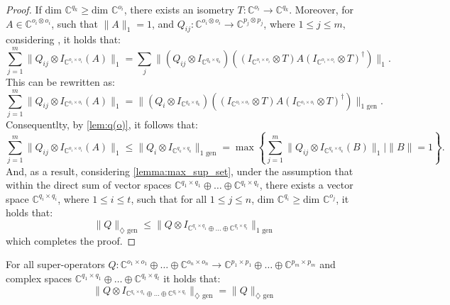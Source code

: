 \begin{proof}
  
  If $\text{dim } \mathbb{C}^{q_k} \geq \text{dim } \mathbb{C}^{o_i}$, there exists an isometry $T: \mathbb{C}^{o_i} \rightarrow \mathbb{C}^{q_k}$. Moreover, for $A \in \mathbb{C}^{o_i \otimes o_i}$, such that $\|A\|_1=1$, and $Q_{ij}: \mathbb{C}^{o_i \otimes o_i} \rightarrow \mathbb{C}^{p_j \otimes p_j}$, where $1 \leq j \leq m$, considering \cite[Proof of Theorem 3.36]{watrous2018theory}, it holds that:
  \begin{equation}
    \sum_{j=1}^{m} \lVert Q_{ij} \otimes I_{\mathbb{C}^{o_i \times o_i}} (A) \rVert_{1} = \sum_j \lVert (Q_{ij} \otimes I_{\mathbb{C}^{q_k \times q_k}}) ((I_{\mathbb{C}^{o_i \times o_i}} \otimes T) A (I_{\mathbb{C}^{o_i \times o_i}} \otimes T )^\dag) \rVert_{1}. 
  \end{equation}
This can be rewritten as:
\begin{equation}
  \sum_{j=1}^{m} \lVert Q_{ij} \otimes I_{\mathbb{C}^{o_i \times o_i}} (A) \rVert_{1} =  \lVert (Q_{i} \otimes I_{\mathbb{C}^{q_k \times q_k}}) ((I_{\mathbb{C}^{o_i \times o_i}} \otimes T) A (I_{\mathbb{C}^{o_i \times o_i}} \otimes T )^\dag) \rVert_{1 \text{ gen}}. 
\end{equation}
Consequentlty, by \autoref{lem:q(o)}, it follows that:
\begin{equation}
  \sum_{j=1}^{m} \lVert Q_{ij} \otimes I_{\mathbb{C}^{o_i \times o_i}} (A) \rVert_{1} \leq \lVert Q_{i} \otimes I_{\mathbb{C}^{q_k \times q_k}} \rVert_{1 \text{ gen}} = \max \left\{\sum_{j=1}^{m} \lVert Q_{ij} \otimes I_{\mathbb{C}^{q_k \times q_k}} (B) \rVert_{1} \mid \|B\| = 1\right\}.
\end{equation}
And, as a result, considering \autoref{lemma:max_sup_set},  under the assumption that within the direct sum of vector spaces $\mathbb{C}^{q_1 \times q_1} \oplus \ldots \oplus \mathbb{C}^{q_t \times q_t}$, there  exists a vector space $\mathbb{C}^{q_i \times q_i}$, where $1 \leq i \leq t$, such that for all $1 \leq j \leq n$, $\text{dim }\mathbb{C}^{q_i} \geq  \text{dim }\mathbb{C}^{o_j}$, it holds that: 
\begin{equation}
    \lVert Q \rVert_{\diamondsuit \text{ gen}} \leq  \lVert Q \otimes I_{\mathbb{C}^{q_1 \times q_1} \oplus \ldots \oplus \mathbb{C}^{q_t \times q_t}} \rVert_{1 \text{ gen}}
\end{equation}
which completes the proof.
\end{proof}

 
 

\begin{corollary} \label{cor:tensor_stability}
  For all super-operators  $Q: \mathbb{C}^{o_1 \times o_1} \oplus \ldots \oplus \mathbb{C}^{o_n \times o_n}  \rightarrow \mathbb{C}^{p_1 \times p_1} \oplus \ldots \oplus  \mathbb{C}^{p_m \times p_m}$ and complex spaces $\mathbb{C}^{q_1 \times q_1} \oplus \ldots \oplus \mathbb{C}^{q_t \times q_t}$   it holds that:
\begin{equation}
   \lVert Q \otimes I_{\mathbb{C}^{q_1 \times q_1} \oplus \ldots \oplus \mathbb{C}^{q_t \times q_t}} \rVert_{\diamondsuit \text{ gen}} = \lVert Q \rVert_{\diamondsuit \text{ gen}} 
\end{equation}
\end{corollary}



